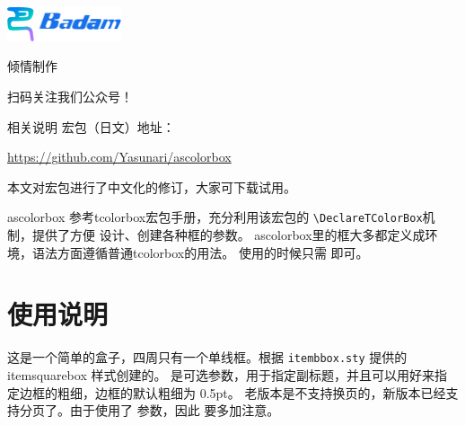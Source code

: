 \documentclass[fontset=none]{ctexart}
\begin{document}
	
	
	\begin{titlepage}
		\thispagestyle{empty}
		
		\vspace*{3cm}
		\begin{center}
			\huge
			
		\end{center}
		
		\bigskip\bigskip
		
		\begin{center}
			\includegraphics[height=1cm]{latexstudio} 
			
			倾情制作 
			
			
			扫码关注我们公众号！
			
			
			\begin{minipage}{9.5cm}
				\begin{ascolorbox17}{相关说明}
					\color{listred}
					宏包（日文）地址：
					
					\url{https://github.com/Yasunari/ascolorbox}
					
					本文对宏包进行了中文化的修订，大家可下载试用。
				\end{ascolorbox17}
			\end{minipage}
		\end{center}
		
		
		
		
		
	\end{titlepage}
	\newpage 
	
	ascolorbox 参考tcolorbox宏包手册，充分利用该宏包的 \verb|\DeclareTColorBox|机制，提供了方便
	设计、创建各种框的参数。 ascolorbox里的框大多都定义成环境，语法方面遵循普通tcolorbox的用法。
	使用的时候只需 即可。
	
	
	
	
	
	
	\section{使用说明}
	这是一个简单的盒子，四周只有一个单线框。根据 \verb|itembbox.sty| 提供的 itemsquarebox 样式创建的。
	 是可选参数，用于指定副标题，并且可以用好来指定边框的粗细，边框的默认粗细为 0.5pt。
	老版本是不支持换页的，新版本已经支持分页了。由于使用了   参数，因此  要多加注意。
	
\end{document}
